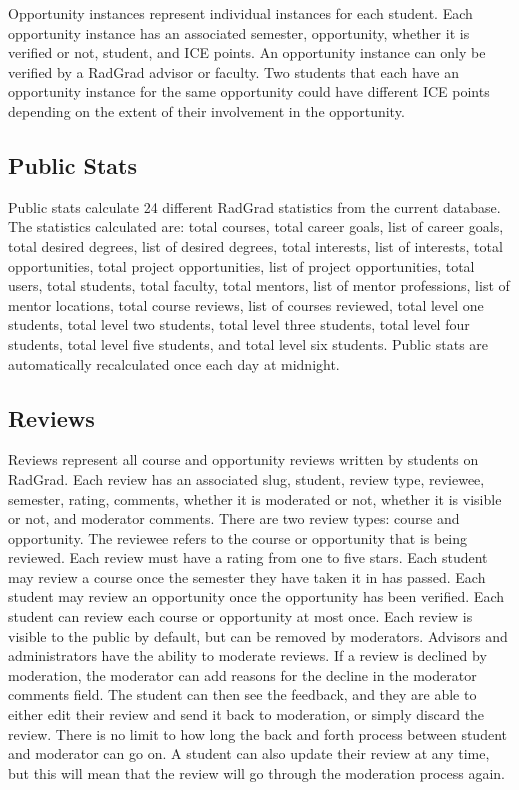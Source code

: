 Opportunity instances represent individual instances for each student. Each opportunity instance has an associated semester, opportunity, whether it is verified or not, student, and ICE points. An opportunity instance can only be verified by a RadGrad advisor or faculty. Two students that each have an opportunity instance for the same opportunity could have different ICE points depending on the extent of their involvement in the opportunity.    

\subsection{Public Stats}
Public stats calculate 24 different RadGrad statistics from the current database. The statistics calculated are: total courses, total career goals, list of career goals, total desired degrees, list of desired degrees, total interests, list of interests, total opportunities, total project opportunities, list of project opportunities, total users, total students, total faculty, total mentors, list of mentor professions, list of mentor locations, total course reviews, list of courses reviewed, total level one students, total level two students, total level three students, total level four students, total level five students, and total level six students. Public stats are automatically recalculated once each day at midnight. 

\subsection{Reviews}
Reviews represent all course and opportunity reviews written by students on RadGrad. Each review has an associated slug, student, review type, reviewee, semester, rating, comments, whether it is moderated or not, whether it is visible or not, and moderator comments. There are two review types: course and opportunity. The reviewee refers to the course or opportunity that is being reviewed. Each review must have a rating from one to five stars. Each student may review a course once the semester they have taken it in has passed. Each student may review an opportunity once the opportunity has been verified. Each student can review each course or opportunity at most once. Each review is visible to the public by default, but can be removed by moderators. Advisors and administrators have the ability to moderate reviews. If a review is declined by moderation, the moderator can add reasons for the decline in the moderator comments field. The student can then see the feedback, and they are able to either edit their review and send it back to moderation, or simply discard the review. There is no limit to how long the back and forth process between student and moderator can go on. A student can also update their review at any time, but this will mean that the review will go through the moderation process again.


